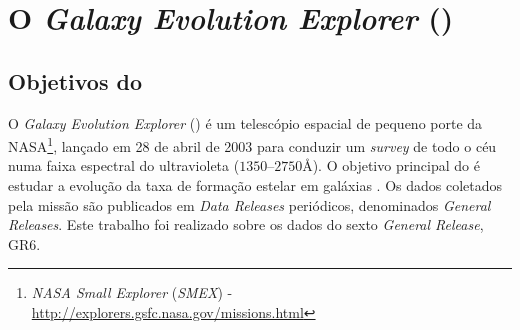 


\chapter{O {\em Galaxy Evolution Explorer} (\galex)}
\label{sec:Galex}



\section{Objetivos do \galex}
\label{sec:Galex:Objetivos}

O {\em Galaxy Evolution Explorer} (\galex) é um telescópio espacial de pequeno
porte da NASA\footnote{{\em NASA Small Explorer} ({\em SMEX}) -
\url{http://explorers.gsfc.nasa.gov/missions.html}}, lançado em 28 de abril de
2003 para conduzir um {\em survey} de todo o céu numa faixa espectral do
ultravioleta ($1350$--$2750$\AA). O objetivo principal do \galex é estudar a
evolução da taxa de formação estelar em galáxias \citep{Martin2005}. Os dados
coletados pela missão são publicados em {\em Data Releases} periódicos,
denominados {\em General Releases}. Este trabalho foi realizado sobre os dados
do sexto {\em General Release}, GR6.

